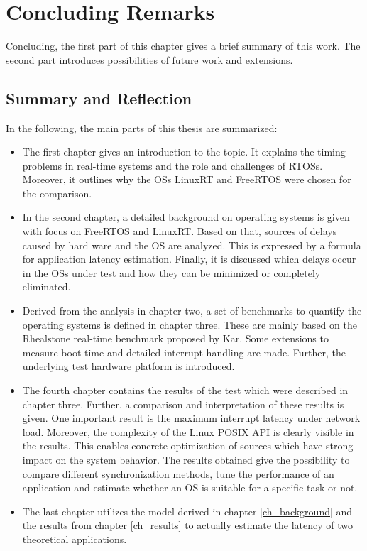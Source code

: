\chapter{Concluding Remarks}\label{ch_conclusion}
Concluding, the first part of this chapter gives a brief summary of this work.
The second part introduces possibilities of future work and extensions.

\section{Summary and Reflection}   
In the following, the main parts of this thesis are summarized:

\begin{itemize}
	\item 
	The first chapter gives an introduction to the topic. 
	It explains the timing problems in real-time systems and the role and challenges of \acp{RTOS}.
	Moreover, it outlines why the \acp{OS} LinuxRT and FreeRTOS were chosen for the comparison.
	\item
	In the second chapter, a detailed background on operating systems is given with focus on FreeRTOS and LinuxRT.
	Based on that, sources of delays caused by hard ware and the \ac{OS} are analyzed.
	This is expressed by a formula for application latency estimation.
	Finally, it is discussed which delays occur in the \acp{OS} under test and how they can be minimized or completely eliminated.
	\item
	Derived from the analysis in chapter two, a set of benchmarks to quantify the operating systems is defined in chapter three.
	These are mainly based on the Rhealstone real-time benchmark proposed by Kar.
	Some extensions to measure boot time and detailed interrupt handling are made.
	Further, the underlying test hardware platform is introduced.
	\item
	The fourth chapter contains the results of the test which were described in chapter three.
	Further, a comparison and interpretation of these results is given.
	One important result is the maximum interrupt latency under network load.
	Moreover, the complexity of the Linux POSIX \ac{API} is clearly visible in the results.
	This enables concrete optimization of sources which have strong impact on the system behavior.	
	The results obtained give the possibility to compare different synchronization methods, tune the performance of an application and estimate whether an \ac{OS} is suitable for a specific task or not.
	\item 
	The last chapter utilizes the model derived in chapter \ref{ch_background} and the results from chapter 	\ref{ch_results} to actually estimate the latency of two theoretical applications.
\end{itemize}

